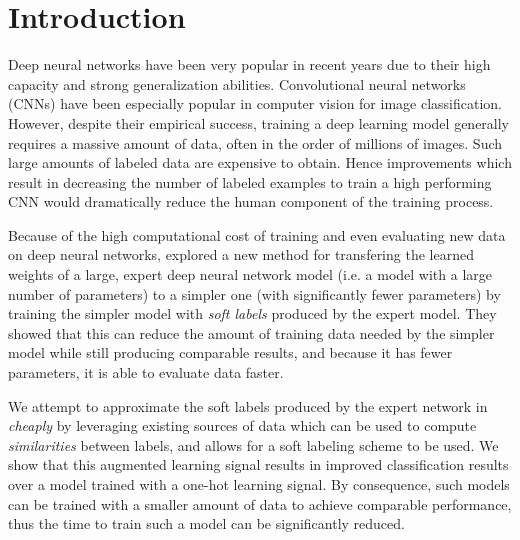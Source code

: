 \section{Introduction}

Deep neural networks have been very popular in recent years due to their high
capacity and strong generalization abilities.  Convolutional neural networks
(CNNs) have been especially popular in computer vision for image classification.
However, despite their empirical success, training a deep learning model
generally requires a massive amount of data, often in the order of millions of
images. Such large amounts of labeled data are expensive to obtain. Hence 
improvements which result in decreasing the number of labeled examples to train
a high performing CNN would dramatically reduce the human component of the
training process.

Because of the high computational cost of training and even evaluating new data
on deep neural networks, \cite{hinton2015distilling} explored a new method
for transfering the learned weights of a large, expert deep neural network model
(i.e. a model with a large number of parameters) to a simpler one (with
significantly fewer parameters) by training the simpler model with \emph{soft
labels} produced by the expert model. They showed that this can reduce the
amount of training data needed by the simpler model while still producing
comparable results, and because it has fewer parameters, it is able to evaluate
data faster.

We attempt to approximate the soft labels produced by the expert network in
\cite{hinton2015distilling} \emph{cheaply} by leveraging existing sources of
data which can be used to compute \emph{similarities} between labels, and allows
for a soft labeling scheme to be used.  We show that this augmented learning
signal results in improved classification results over a model trained with a
one-hot learning signal. By consequence, such models can be trained with a
smaller amount of data to achieve comparable performance, thus the time to train
such a model can be significantly reduced.


